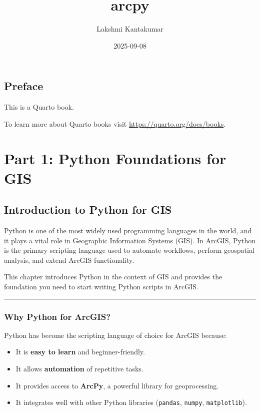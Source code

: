 \documentclass[
  11pt,
  letterpaper,
]{book}
\title{arcpy}
\author{Lakshmi Kantakumar}
\date{2025-09-08}
\providecommand{\tightlist}{%
  \setlength{\itemsep}{0pt}\setlength{\parskip}{0pt}}
\renewcommand*\contentsname{Table of contents}
\newcommand\contentsname{Table of contents}
\begin{document}
\frontmatter
\maketitle

\renewcommand*\contentsname{Table of contents}
{
\setcounter{tocdepth}{1}
\tableofcontents
}

\mainmatter
{}

\chapter*{Preface}\label{preface}


This is a Quarto book.

To learn more about Quarto books visit
\url{https://quarto.org/docs/books}.

\part{Part 1: Python Foundations for GIS}

\chapter{Introduction to Python for
GIS}\label{introduction-to-python-for-gis}

Python is one of the most widely used programming languages in the
world, and it plays a vital role in Geographic Information Systems
(GIS). In ArcGIS, Python is the primary scripting language used to
automate workflows, perform geospatial analysis, and extend ArcGIS
functionality.

This chapter introduces Python in the context of GIS and provides the
foundation you need to start writing Python scripts in ArcGIS.

\begin{center}\rule{0.5\linewidth}{0.5pt}\end{center}

\section{Why Python for ArcGIS?}\label{why-python-for-arcgis}

Python has become the scripting language of choice for ArcGIS because:

\begin{itemize}
\tightlist
\item
  It is \textbf{easy to learn} and beginner-friendly.\\
\item
  It allows \textbf{automation} of repetitive tasks.\\
\item
  It provides access to \textbf{ArcPy}, a powerful library for
  geoprocessing.\\
\item
  It integrates well with other Python libraries (\texttt{pandas},
  \texttt{numpy}, \texttt{matplotlib}).
\end{itemize}
\end{document}
